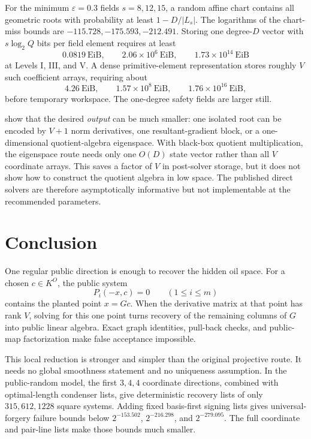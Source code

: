 \documentclass[11pt,a4paper]{article}
\theoremstyle{definition}
\theoremstyle{remark}
\begin{document}
For the minimum $\varepsilon=0.3$ fields $s=8,12,15$, a random affine chart contains all geometric roots with probability at least $1-D/|L_s|$.  The logarithms of the chart-miss bounds are $-115.728,-175.593,-212.491$.  Storing one degree-$D$ vector with $s\log_2Q$ bits per field element requires at least
\[
0.0819\ \mathrm{EiB},\qquad
2.06\times10^6\ \mathrm{EiB},\qquad
1.73\times10^{14}\ \mathrm{EiB}
\]
at Levels I, III, and V.  A dense primitive-element representation stores roughly $V$ such coefficient arrays, requiring about
\[
4.26\ \mathrm{EiB},\qquad
1.57\times10^8\ \mathrm{EiB},\qquad
1.76\times10^{16}\ \mathrm{EiB},
\]
before temporary workspace.  The one-degree safety fields are larger still.

 show that the desired \emph{output} can be much smaller: one isolated root can be encoded by $V+1$ norm derivatives, one resultant-gradient block, or a one-dimensional quotient-algebra eigenspace.  With black-box quotient multiplication, the eigenspace route needs only one $O(D)$ state vector rather than all $V$ coordinate arrays.  This saves a factor of $V$ in post-solver storage, but it does not show how to construct the quotient algebra in low space.  The published direct solvers are therefore asymptotically informative but not implementable at the recommended parameters.

\section{Conclusion}\label{sec:conclusion}

One regular public direction is enough to recover the hidden oil space.  For a chosen $c\in K^O$, the public system
\[
 P_i(-x,c)=0\qquad(1\le i\le m)
\]
contains the planted point $x=Gc$.  When the derivative matrix at that point has rank $V$, solving for this one point turns recovery of the remaining columns of $G$ into public linear algebra.  Exact graph identities, pull-back checks, and public-map factorization make false acceptance impossible.

This local reduction is stronger and simpler than the original projective route.  It needs no global smoothness statement and no uniqueness assumption.  In the public-random model, the first $3,4,4$ coordinate directions, combined with optimal-length condenser lists, give deterministic recovery lists of only $315,612,1228$ square systems.  Adding fixed basis-first signing lists gives universal-forgery failure bounds below $2^{-153.502}$, $2^{-216.298}$, and $2^{-279.095}$.  The full coordinate and pair-line lists make those bounds much smaller.
\end{document}
